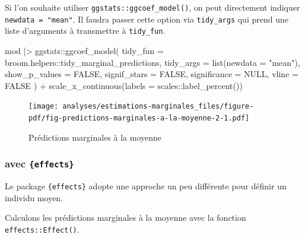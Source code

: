 \documentclass[
  letterpaper,
  DIV=11,
  numbers=noendperiod,
  oneside]{scrreprt}
\newenvironment{Shaded}{\begin{snugshade}}{\end{snugshade}}
\newcommand{\AttributeTok}[1]{\textcolor[rgb]{0.40,0.45,0.13}{#1}}
\newcommand{\ConstantTok}[1]{\textcolor[rgb]{0.56,0.35,0.01}{#1}}
\newcommand{\FunctionTok}[1]{\textcolor[rgb]{0.28,0.35,0.67}{#1}}
\newcommand{\NormalTok}[1]{\textcolor[rgb]{0.00,0.23,0.31}{#1}}
\newcommand{\SpecialCharTok}[1]{\textcolor[rgb]{0.37,0.37,0.37}{#1}}
\newcommand{\StringTok}[1]{\textcolor[rgb]{0.13,0.47,0.30}{#1}}
\begin{document}
Si l'on souhaite utiliser \texttt{ggstats::ggcoef\_model()}, on peut
directement indiquer \texttt{newdata\ =\ "mean"}. Il faudra passer cette
option via \texttt{tidy\_args} qui prend une liste d'arguments à
transmettre à \texttt{tidy\_fun}.

\begin{Shaded}
\begin{Highlighting}[]
\NormalTok{mod }\SpecialCharTok{|\textgreater{}} 
\NormalTok{  ggstats}\SpecialCharTok{::}\FunctionTok{ggcoef\_model}\NormalTok{(}
    \AttributeTok{tidy\_fun =}\NormalTok{ broom.helpers}\SpecialCharTok{::}\NormalTok{tidy\_marginal\_predictions,}
    \AttributeTok{tidy\_args =} \FunctionTok{list}\NormalTok{(}\AttributeTok{newdata =} \StringTok{"mean"}\NormalTok{),}
    \AttributeTok{show\_p\_values =} \ConstantTok{FALSE}\NormalTok{,}
    \AttributeTok{signif\_stars =} \ConstantTok{FALSE}\NormalTok{,}
    \AttributeTok{significance =} \ConstantTok{NULL}\NormalTok{,}
    \AttributeTok{vline =} \ConstantTok{FALSE}
\NormalTok{  ) }\SpecialCharTok{+}
  \FunctionTok{scale\_x\_continuous}\NormalTok{(}\AttributeTok{labels =}\NormalTok{ scales}\SpecialCharTok{::}\FunctionTok{label\_percent}\NormalTok{())}
\end{Highlighting}
\end{Shaded}

\begin{figure}[H]

{\centering \texttt{[image: analyses/estimations-marginales\_files/figure-pdf/fig-predictions-marginales-a-la-moyenne-2-1.pdf]}

}

\caption{\label{fig-predictions-marginales-a-la-moyenne-2}Prédictions
marginales à la moyenne}

\end{figure}

\hypertarget{avec-effects}{%
\subsubsection{\texorpdfstring{avec
\texttt{\{effects\}}}{avec \{effects\}}}\label{avec-effects}}

Le package \texttt{\{effects\}} adopte une approche un peu différente pour définir un
individu moyen.

Calculons les prédictions marginales à la moyenne avec la fonction
\texttt{effects::Effect()}.
\end{document}
